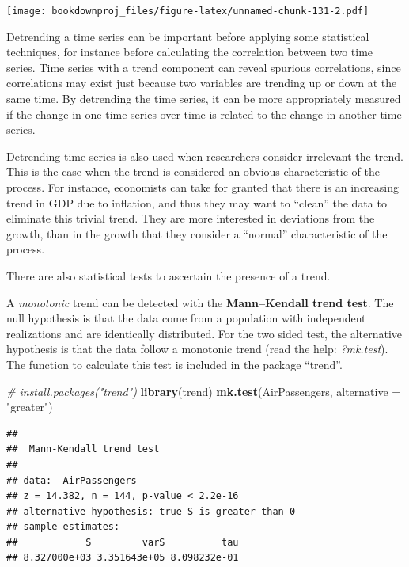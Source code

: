 \documentclass[
]{article}
\newenvironment{Shaded}{\begin{snugshade}}{\end{snugshade}}
\newcommand{\CommentTok}[1]{\textcolor[rgb]{0.56,0.35,0.01}{\textit{#1}}}
\newcommand{\DataTypeTok}[1]{\textcolor[rgb]{0.13,0.29,0.53}{#1}}
\newcommand{\KeywordTok}[1]{\textcolor[rgb]{0.13,0.29,0.53}{\textbf{#1}}}
\newcommand{\NormalTok}[1]{#1}
\newcommand{\StringTok}[1]{\textcolor[rgb]{0.31,0.60,0.02}{#1}}
\begin{document}
\texttt{[image: bookdownproj\_files/figure-latex/unnamed-chunk-131-2.pdf]}

Detrending a time series can be important before applying some statistical techniques, for instance before calculating the correlation between two time series. Time series with a trend component can reveal spurious correlations, since correlations may exist just because two variables are trending up or down at the same time. By detrending the time series, it can be more appropriately measured if the change in one time series over time is related to the change in another time series.

Detrending time series is also used when researchers consider irrelevant the trend. This is the case when the trend is considered an obvious characteristic of the process. For instance, economists can take for granted that there is an increasing trend in GDP due to inflation, and thus they may want to ``clean'' the data to eliminate this trivial trend. They are more interested in deviations from the growth, than in the growth that they consider a ``normal'' characteristic of the process.

There are also statistical tests to ascertain the presence of a trend.

A \emph{monotonic} trend can be detected with the \textbf{Mann--Kendall trend test}. The null hypothesis is that the data come from a population with independent realizations and are identically distributed. For the two sided test, the alternative hypothesis is that the data follow a monotonic trend (read the help: \emph{?mk.test}). The function to calculate this test is included in the package ``trend''.

\begin{Shaded}
\begin{Highlighting}[]
\CommentTok{# install.packages("trend")}
\KeywordTok{library}\NormalTok{(trend)}
\KeywordTok{mk.test}\NormalTok{(AirPassengers, }\DataTypeTok{alternative =} \StringTok{"greater"}\NormalTok{)}
\end{Highlighting}
\end{Shaded}

\begin{verbatim}
## 
##  Mann-Kendall trend test
## 
## data:  AirPassengers
## z = 14.382, n = 144, p-value < 2.2e-16
## alternative hypothesis: true S is greater than 0
## sample estimates:
##            S         varS          tau 
## 8.327000e+03 3.351643e+05 8.098232e-01
\end{verbatim}
\end{document}
